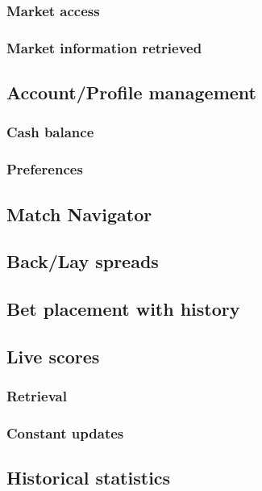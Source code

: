 \documentclass[10pt]{report}
\begin{document}
\subsubsection {Market access}
\subsubsection {Market information retrieved}


\subsection {Account/Profile management}
\subsubsection {Cash balance}
\subsubsection {Preferences}

\subsection {Match Navigator}

\subsection {Back/Lay spreads}

\subsection {Bet placement with history}

\subsection {Live scores}
\subsubsection {Retrieval}
\subsubsection {Constant updates}

\subsection {Historical statistics}
\end{document}
